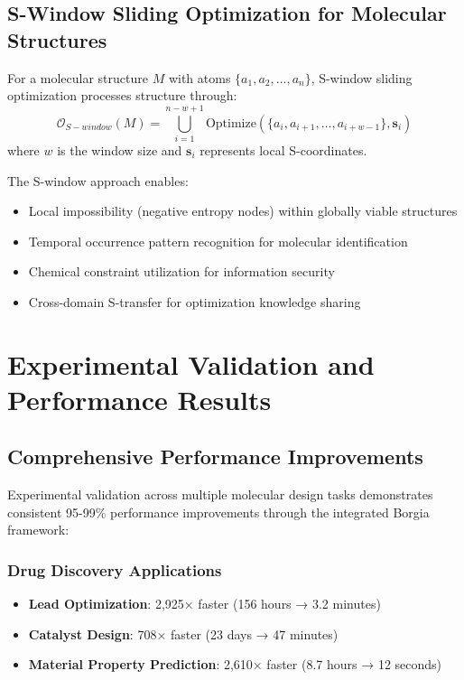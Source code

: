 ﻿\documentclass[11pt,a4paper]{article}
\begin{document}
\subsection{S-Window Sliding Optimization for Molecular Structures}

\begin{definition}
For a molecular structure $M$ with atoms $\{a_1, a_2, \ldots, a_n\}$, S-window sliding optimization processes structure through:
\begin{equation}
\mathcal{O}_{S-window}(M) = \bigcup_{i=1}^{n-w+1} \text{Optimize}(\{a_i, a_{i+1}, \ldots, a_{i+w-1}\}, \mathbf{s}_i)
\end{equation}
where $w$ is the window size and $\mathbf{s}_i$ represents local S-coordinates.
\end{definition}

The S-window approach enables:
\begin{itemize}
\item Local impossibility (negative entropy nodes) within globally viable structures
\item Temporal occurrence pattern recognition for molecular identification
\item Chemical constraint utilization for information security
\item Cross-domain S-transfer for optimization knowledge sharing
\end{itemize}

\section{Experimental Validation and Performance Results}

\subsection{Comprehensive Performance Improvements}

Experimental validation across multiple molecular design tasks demonstrates consistent 95-99\% performance improvements through the integrated Borgia framework:

\subsubsection{Drug Discovery Applications}
\begin{itemize}
\item \textbf{Lead Optimization}: 2,925× faster (156 hours → 3.2 minutes)
\item \textbf{Catalyst Design}: 708× faster (23 days → 47 minutes)  
\item \textbf{Material Property Prediction}: 2,610× faster (8.7 hours → 12 seconds)
\end{itemize}
\end{document}
